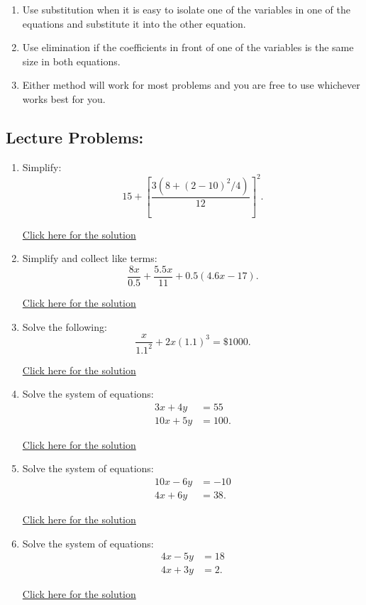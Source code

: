\documentclass[
]{book}
\providecommand{\tightlist}{%
  \setlength{\itemsep}{0pt}\setlength{\parskip}{0pt}}
\begin{document}
\begin{enumerate}
  \begin{enumerate}
  \def\labelenumii{\arabic{enumii}.}
  \tightlist
  \item
    Use substitution when it is easy to isolate one of the variables in one of the equations and substitute it into the other equation.
  \item
    Use elimination if the coefficients in front of one of the variables is the same size in both equations.
  \item
    Either method will work for most problems and you are free to use whichever works best for you.
  \end{enumerate}
\end{enumerate}

\subsection*{Lecture Problems:}\label{lecture-problems}

\begin{enumerate}
\def\labelenumi{\arabic{enumi}.}
\tightlist
\item
  Simplify: \[15 + \left[ \frac{3\left(8 + (2 - 10)^2 /4 \right)}{12} \right]^2.\]

  \href{https://youtu.be/3WmpvL441rA}{Click here for the solution}
\item
  Simplify and collect like terms: \[\frac{8x}{0.5} + \frac{5.5x}{11} + 0.5\left(4.6x - 17 \right).\]

  \href{https://youtu.be/BHPP---sVZw}{Click here for the solution}
\item
  Solve the following: \[\frac{x}{1.1^2} + 2x(1.1)^3 = \$1000.\]

  \href{https://youtu.be/PZqTWdq1wiI}{Click here for the solution}
\item
  Solve the system of equations: \begin{align*}     3x + 4y &= 55\\  10x + 5y &= 100.\end{align*}

  \href{https://youtu.be/LvRuXkQ5Mao}{Click here for the solution}
\item
  Solve the system of equations: \begin{align*}     10x - 6y &= -10 \\ 4x + 6y &= 38.\end{align*}

  \href{https://youtu.be/YQjb2Z6y51E}{Click here for the solution}
\item
  Solve the system of equations: \begin{align*}     4x - 5y &= 18 \\ 4x + 3y &= 2.\end{align*}

  \href{https://youtu.be/c_YPN8Xt0Fc}{Click here for the solution}
\end{enumerate}
\end{document}
